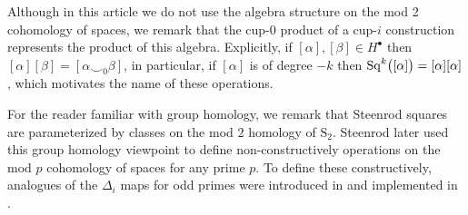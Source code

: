 \begin{remark}
	Although in this article we do not use the algebra structure on the mod 2 cohomology of spaces, we remark that the cup-$0$ product of a cup-$i$ construction represents the product of this algebra.
	Explicitly, if $[\alpha], [\beta] \in H^\bullet$ then $[\alpha][\beta] = [\alpha \smallsmile_0 \beta]$, in particular, if $[\alpha]$ is of degree $-k$ then $\mathrm{Sq}^k\big([\alpha]\big) = [\alpha] [\alpha]$, which motivates the name of these operations.
\end{remark}

\begin{remark}
	For the reader familiar with group homology, we remark that Steenrod squares are parameterized by classes on the mod $2$ homology of $\mathrm S_2$.
	Steenrod later used this group homology viewpoint to define non-constructively operations on the mod $p$ cohomology of spaces \cite{steenrod1962cohomology} for any prime $p$.
	To define these constructively, analogues of the $\Delta_i$ maps for odd primes were introduced in \cite{medina2020odd} and implemented in \cite{medina2021computer}.
\end{remark}